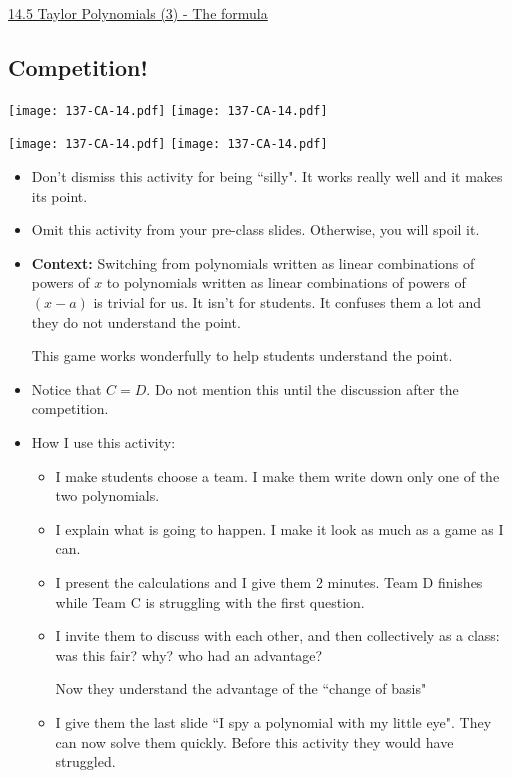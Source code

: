 \documentclass[11pt]{article}
\newcommand {\DS} [1] {${\displaystyle #1}$}
\newcommand{\nl}{\hfill \vspace{-1.1\baselineskip}} %
\newcommand{\vv}{\hspace{8mm}  \href{https://www.youtube.com/watch?v=c-rI1zMj0wA&list=PLlwePzQY_wW9h32ZwS6CYsY4eR_b2pE9j&index=5}{14.5 Taylor Polynomials (3) - The formula}}
\begin{document}
\begin{videos}
\vv
\end{videos}

\newpage
\subsection{Competition!}

\begin{center}
{ \texttt{[image: 137-CA-14.pdf]}}  \quad
{ \texttt{[image: 137-CA-14.pdf]}} 

{ \texttt{[image: 137-CA-14.pdf]}}  \quad
{ \texttt{[image: 137-CA-14.pdf]}} 
\end{center}

\begin{warning}
\nl
	\begin{itemize}
		\item Don't dismiss this activity for being ``silly".  It works really well and it makes its point.
		\item  Omit this activity from your pre-class slides.  Otherwise, you will spoil it.
	\end{itemize}
\end{warning}


\begin{comments}
\nl
	\begin{itemize}
		\item {\bf Context:}   Switching from polynomials written as linear combinations of powers of $x$ to polynomials written as linear combinations of powers of $(x-a)$ is trivial for us.  It isn't for students.  It confuses them a lot and they do not understand the point.
		
		This game works wonderfully to help students understand the point.
		
		\item Notice that \DS{C = D}.  Do not mention this until the discussion after the competition.
		
		\item How I use this activity:
			\begin{itemize}
				\item  I make students choose a team.  I make them write down only one of the two polynomials.
				\item I explain what is going to happen.  I make it look as much as a game as I can.
				\item I present the calculations and I give them 2 minutes.  Team D finishes while Team C is struggling with the first question.
				\item I invite them to discuss with each other, and then collectively as a class:  was this fair?  why?  who had an advantage?
				
				Now they understand the advantage of the ``change of basis"
				\item  I give them the last slide ``I spy a polynomial with my little eye".  They can now solve them quickly.  Before this activity they would have struggled.
			\end{itemize}
	\end{itemize}
\end{comments}
\end{document}

